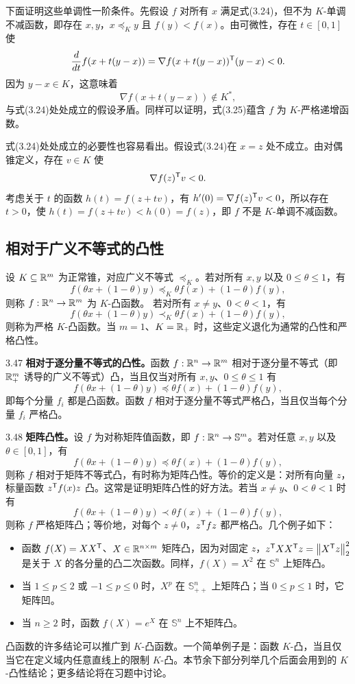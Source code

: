 下面证明这些单调性一阶条件。先假设 $f$ 对所有 $x$ 满足式(3.24)，但不为 $K$-单调不减函数，即存在 $x,y$，$x\preceq_K y$ 且 $f(y)<f(x)$。由可微性，存在 $t\in[0,1]$ 使
\[\frac d{dt}f(x+t(y-x))=\nabla f(x+t(y-x))^\mathsf T(y-x)<0.\]
因为 $y-x\in K$，这意味着
\[\nabla f(x+t(y-x))\notin K^*,\]
与式(3.24)处处成立的假设矛盾。同样可以证明，式(3.25)蕴含 $f$ 为 $K$-严格递增函数。

式(3.24)处处成立的必要性也容易看出。假设式(3.24)在 $x=z$ 处不成立。由对偶锥定义，存在 $v\in K$ 使
\[\nabla f(z)^\mathsf T v<0.\]
考虑关于 $t$ 的函数 $h(t)=f(z+tv)$，有 $h'(0)=\nabla f(z)^\mathsf T v<0$，所以存在 $t>0$，使 $h(t)=f(z+tv)<h(0)=f(z)$，即 $f$ 不是 $K$-单调不减函数。
\subsection{相对于广义不等式的凸性}
设 $K\subseteq\mathbb R^m$ 为正常锥，对应广义不等式 $\preceq_K$。若对所有 $x,y$ 以及 $0\leq\theta\leq1$，有
\[f(\theta x+(1-\theta)y)\preceq_K\theta f(x)+(1-\theta)f(y),\]
则称 $f:\mathbb R^n\to\mathbb R^m$ 为 $K$-凸函数。
若对所有 $x\ne y$、$0<\theta<1$，有
\[f(\theta x+(1-\theta)y)\prec_K\theta f(x)+(1-\theta)f(y),\]
则称为严格 $K$-凸函数。当 $m=1$、$K=\mathbb R_+$ 时，这些定义退化为通常的凸性和严格凸性。
\begin{origexample}{3.47}
\textbf{相对于逐分量不等式的凸性。}函数 $f:\mathbb R^n\to\mathbb R^m$ 相对于逐分量不等式（即 $\mathbb R_+^m$ 诱导的广义不等式）凸，当且仅当对所有 $x,y$、$0\leq\theta\leq1$ 有
\[f(\theta x+(1-\theta)y)\preceq\theta f(x)+(1-\theta)f(y),\]
即每个分量 $f_i$ 都是凸函数。函数 $f$ 相对于逐分量不等式严格凸，当且仅当每个分量 $f_i$ 严格凸。
\end{origexample}
\begin{origexample}{3.48}
\textbf{矩阵凸性。}设 $f$ 为对称矩阵值函数，即 $f:\mathbb R^n\to\mathbb S^m$。若对任意 $x,y$ 以及 $\theta\in[0,1]$，有
\[f(\theta x+(1-\theta)y)\preceq\theta f(x)+(1-\theta)f(y),\]
则称 $f$ 相对于矩阵不等式凸，有时称为矩阵凸性。等价的定义是：对所有向量 $z$，标量函数 $z^\mathsf T f(x)z$ 凸。这常是证明矩阵凸性的好方法。若当 $x\ne y$、$0<\theta<1$ 时有
\[f(\theta x+(1-\theta)y)\prec\theta f(x)+(1-\theta)f(y),\]
则称 $f$ 严格矩阵凸；等价地，对每个 $z\ne0$，$z^\mathsf T fz$ 都严格凸。几个例子如下：
\begin{itemize}
\item 函数 $f(X)=XX^\mathsf T$、$X\in\mathbb R^{n\times m}$ 矩阵凸，因为对固定 $z$，$z^\mathsf T XX^\mathsf T z=\left\lVert X^\mathsf T z\right\rVert_2^2$ 是关于 $X$ 的各分量的凸二次函数。同样，$f(X)=X^2$ 在 $\mathbb S^n$ 上矩阵凸。
\item 当 $1\leq p\leq2$ 或 $-1\leq p\leq0$ 时，$X^p$ 在 $\mathbb S_{++}^n$ 上矩阵凸；当 $0\leq p\leq1$ 时，它矩阵凹。
\item 当 $n\geq2$ 时，函数 $f(X)=e^X$ 在 $\mathbb S^n$ 上不矩阵凸。
\end{itemize}
\end{origexample}
凸函数的许多结论可以推广到 $K$-凸函数。一个简单例子是：函数 $K$-凸，当且仅当它在定义域内任意直线上的限制 $K$-凸。本节余下部分列举几个后面会用到的 $K$-凸性结论；更多结论将在习题中讨论。
